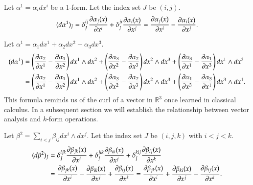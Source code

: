 \documentclass[11pt, a4paper]{book}
\begin{document}
\begin{Example}
  Let $\alpha^1 = \alpha_i dx^i$ be a 1-form. Let the index set $J$ be $(i,j)$.
  \begin{equation}
    \label{eq:exterior-diff-1-form}
    (d\alpha^1)_{J} = \delta_{J}^{ij} \frac{\partial \alpha_j(x)}{\partial x^i} +
    \delta_{J}^{ji} \frac{\partial \alpha_i(x)}{\partial x^j} = \frac{\partial
      \alpha_j(x)}{\partial x^i} - \frac{\partial \alpha_i(x)}{\partial x^j}.
  \end{equation}
\end{Example}

\begin{Example}
  Let $\alpha^1 = \alpha_1dx^1 + \alpha_2dx^2 + \alpha_3dx^3$.
  \begin{equation}
    \label{eq:exterior-diff-1-form-3d}
    \begin{aligned}
      (d\alpha^1) &= \left( \frac{\partial \alpha_2}{\partial x^1} - \frac{\partial
          \alpha_1}{\partial x^2} \right) dx^1 \wedge dx^2 + \left( \frac{\partial
          \alpha_3}{\partial x^2} - \frac{\partial \alpha_2}{\partial x^3} \right) dx^2 \wedge
      dx^3 + \left( \frac{\partial \alpha_3}{\partial x^1} - \frac{\partial \alpha_1}{\partial x^3}
      \right) dx^1 \wedge dx^3 \\
      &= \left( \frac{\partial \alpha_2}{\partial x^1} - \frac{\partial
          \alpha_1}{\partial x^2} \right) dx^1 \wedge dx^2 + \left( \frac{\partial
          \alpha_3}{\partial x^2} - \frac{\partial \alpha_2}{\partial x^3} \right) dx^2 \wedge
      dx^3 + \left( \frac{\partial \alpha_1}{\partial x^3} - \frac{\partial \alpha_3}{\partial x^1}
      \right) dx^3 \wedge dx^1.
    \end{aligned}
  \end{equation}
  This formula reminds us of the curl of a vector in $\mathbb{R}^3$ once learned in
  classical calculus. In a subsequent section we will establish the relationship between
  vector analysis and $k$-form operations.
\end{Example}

\begin{Example}
  Let $\beta^2 = \sum_{i < j} \beta_{ij} dx^i \wedge dx^j$. Let the index set $J$ be
  $(i,j,k)$ with $i < j < k$.
  \begin{equation}
    \label{eq:exterior-diff-2-form}
    \begin{aligned}
      (d\beta^2)_{J} &= \delta_J^{ijk} \frac{\partial \beta_{jk}(x)}{\partial x^i} +
      \delta_J^{jik} \frac{\partial \beta_{ik}(x)}{\partial x^j} + \delta_J^{kij} \frac{\partial
        \beta_{ij}(x)}{\partial x^k} \\
      &= \frac{\partial \beta_{jk}(x)}{\partial x^i} - \frac{\partial \beta_{ik}(x)}{\partial x^j}
      + \frac{\partial \beta_{ij}(x)}{\partial x^k} = \frac{\partial \beta_{jk}(x)}{\partial x^i}
      + \frac{\partial \beta_{ki}(x)}{\partial x^j} + \frac{\partial \beta_{ij}(x)}{\partial x^k}.
    \end{aligned}
  \end{equation}
\end{Example}
\end{document}

